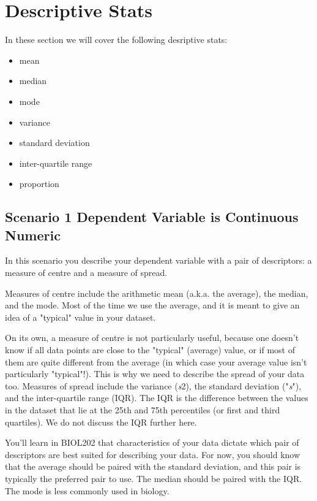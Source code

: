 \documentclass[
]{book}
\providecommand{\tightlist}{%
  \setlength{\itemsep}{0pt}\setlength{\parskip}{0pt}}
\begin{document}
\hypertarget{descriptive-stats}{%
\section*{Descriptive Stats}\label{descriptive-stats}}

In these section we will cover the following desriptive stats:

\begin{itemize}
\tightlist
\item
  mean
\item
  median
\item
  mode
\item
  variance
\item
  standard deviation
\item
  inter-quartile range
\item
  proportion
\end{itemize}

\hypertarget{scenario-1-dependent-variable-is-continuous-numeric}{%
\subsection*{Scenario 1 Dependent Variable is Continuous Numeric}\label{scenario-1-dependent-variable-is-continuous-numeric}}

In this scenario you describe your dependent variable with a pair of descriptors: a measure of centre and a measure of spread.

Measures of centre include the arithmetic mean (a.k.a. the average), the median, and the mode. Most of the time we use the average, and it is meant to give an idea of a "typical" value in your dataset.

On its own, a measure of centre is not particularly useful, because one doesn't know if all data points are close to the "typical" (average) value, or if most of them are quite different from the average (in which case your average value isn't particularly "typical"!). This is why we need to describe the spread of your data too. Measures of spread include the variance (\emph{s}2), the standard deviation ("\emph{s}"), and the inter-quartile range (IQR). The IQR is the difference between the values in the dataset that lie at the 25th and 75th percentiles (or first and third quartiles). We do not discuss the IQR further here.

You'll learn in BIOL202 that characteristics of your data dictate which pair of descriptors are best suited for describing your data. For now, you should know that the average should be paired with the standard deviation, and this pair is typically the preferred pair to use. The median should be paired with the IQR. The mode is less commonly used in biology.
\end{document}
